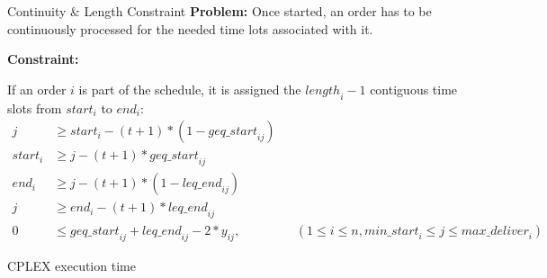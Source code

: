 \documentclass[presentation]{beamer}
\begin{document}
\begin{frame}{Continuity \& Length Constraint}
\textbf{Problem:} Once started, an order has to be continuously processed for the needed time lots associated with it. 

\textbf{Constraint:}

If an order $i$ is part of the schedule, it is assigned the $\mathit{length}_i - 1$ contiguous time slots from $\mathit{start}_i$ to $\mathit{end}_i$:
    \begin{align}
      j &\geq \mathit{start}_i - (t+1) * (1-\mathit{geq\_start}_{ij}) \\
      \mathit{start}_i &\geq j - (t+1) * \mathit{geq\_start}_{ij} \\
      \mathit{end}_i &\geq j - (t+1) * (1-\mathit{leq\_end}_{ij}) \\
      j &\geq \mathit{end}_i - (t+1) * \mathit{leq\_end}_{ij} \\
      0 &\leq \mathit{geq\_start}_{ij} + \mathit{leq\_end}_{ij} - 2 * y_{ij}, &&(1 \leq i \leq n, \mathit{min\_start}_i \leq j \leq \mathit{max\_deliver}_i) 
   \end{align}

\end{frame}

\begin{frame}{CPLEX execution time}
\centering

\end{frame}
\end{document}

